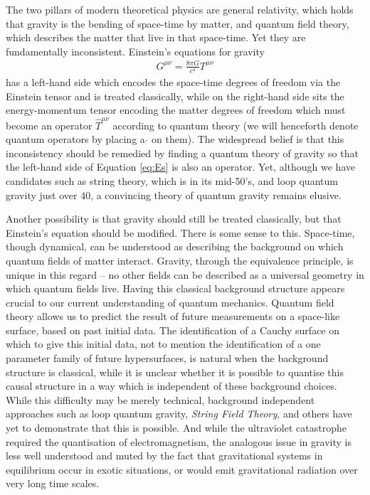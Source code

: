\documentclass[aps,pra,showpacs,citeautoscript,amsmath,amssymb,floatfix,superscriptaddress,bbm, verbatim,amsfonts,changes,10pt,nofootinbib,longbibliography]{revtex4-1}
\begin{document}
The two pillars of modern theoretical physics are general relativity, which holds that gravity is the bending of space-time by matter, and quantum field theory, which describes the matter that live in that space-time. Yet they are fundamentally inconsistent. Einstein's equations for gravity
\begin{align}
G^{\mu\nu}
=\frac{8\pi G}{c^4}{T}^{\mu\nu}
\label{eq:Es}
\end{align}
has a left-hand side which encodes the space-time degrees of freedom via the Einstein tensor and is treated classically, while on the right-hand side sits the energy-momentum tensor encoding the matter degrees of freedom which must become an operator $\hat{T}^{\mu\nu}$ according to quantum theory (we will henceforth denote quantum operators by placing a $\hat{}$ on them)\label{par:hat}.
The widespread belief is that this inconsistency should be remedied by finding a quantum theory of gravity so that the left-hand side of Equation \eqref{eq:Es} is also an operator. Yet, although we have candidates such as string theory, which is in its mid-50's\cite{veneziano1968construction}, and loop quantum gravity just over 40\cite{sen1982gravity,ashtekar1986new,rovelli1988knot}, a convincing theory of quantum gravity remains elusive.

Another possibility is that gravity should still be treated classically, but that Einstein's  equation should be modified. There is some sense to this. Space-time, though dynamical, can be understood as describing the background on which quantum fields of matter interact. Gravity, through the equivalence principle, is unique in this regard --
no other fields can be described as a universal geometry in which quantum fields live.  
Having this classical background structure appears crucial to our current understanding of quantum mechanics. Quantum field theory allows us to predict the result of future measurements on a space-like surface, based on past initial data. The identification of a Cauchy surface on which to give this initial data, not to mention the identification of a one parameter family of future hypersurfaces, is natural when the background structure is classical, while it is unclear whether it is possible to quantise this causal structure in a way which is independent of these background choices. While this difficulty may be merely technical, background independent approaches such as loop quantum gravity, {\it String Field Theory}\cite{PhysRevD.46.5467}, and others\cite{hardy2005probability,oreshkov2012quantum} have yet to demonstrate that this is possible.
And while the ultraviolet 
catastrophe required the quantisation of electromagnetism, the analogous issue in gravity is less well understood\cite{smolin1984thermodynamics} and muted by the fact that gravitational systems in equilibrium occur in exotic situations\cite{hawking1983thermodynamics}, or would emit gravitational radiation over very long time scales\cite{Simidzija_2021}. \label{par:uv}
\end{document}
